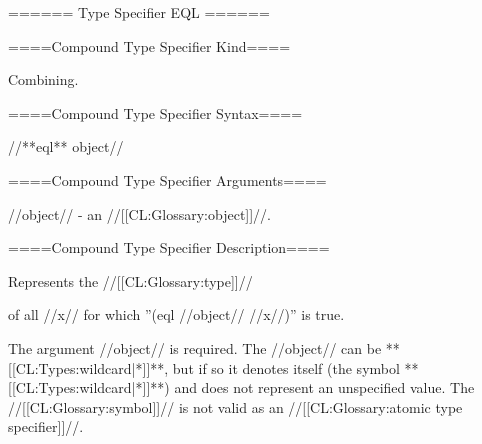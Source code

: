 ====== Type Specifier EQL ======

====Compound Type Specifier Kind====

Combining.

====Compound Type Specifier Syntax====

//**eql** object//

====Compound Type Specifier Arguments====

//object// - an //[[CL:Glossary:object]]//.

====Compound Type Specifier Description====

Represents the //[[CL:Glossary:type]]//

of all //x// for which ''(eql //object// //x//)'' is true.

The argument //object// is required. The //object// can be **[[CL:Types:wildcard|*]]**, but if so it denotes itself (the symbol **[[CL:Types:wildcard|*]]**) and does not represent an unspecified value. The //[[CL:Glossary:symbol]]//  is not valid as an //[[CL:Glossary:atomic type specifier]]//.

